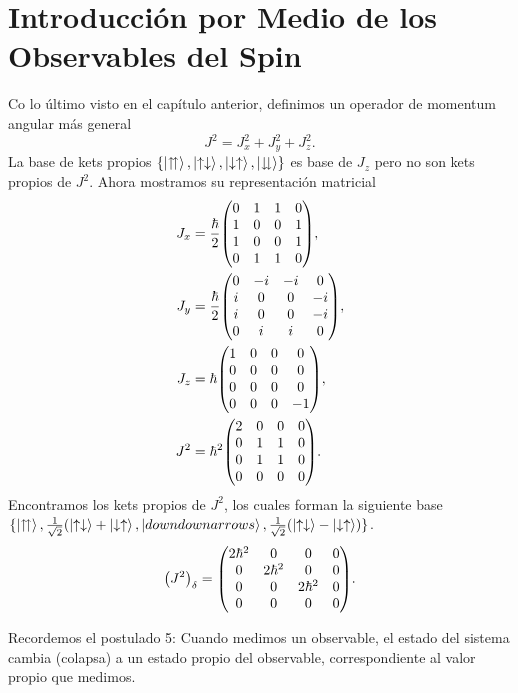 \section{Introducción por Medio de los Observables del Spin}
Co lo último visto en el capítulo anterior, definimos un operador de momentum angular más general
	\begin{equation}
		J^2 = J_x ^2 + J_y ^2 + J_z ^2 .
	\end{equation}
La base de kets propios $\{ \ket{\upuparrows}, \ket{\uparrow \downarrow}, \ket{\downarrow \uparrow}, \ket{\downdownarrows} \}$ es base de $J_z$ pero no son kets propios de $J^2$. Ahora mostramos su representación matricial
\begin{align}
	J_x &= \frac{\hbar}{2} \mqty(0 & 1 & 1 & 0 \\
								 1 & 0 & 0 & 1 \\
								 1 & 0 & 0 & 1 \\
								 0 & 1 & 1 & 0), \\
	J_y &= \frac{\hbar}{2} \mqty(0 & -i & -i & 0 \\
								 i & 0 & 0 & -i \\
								 i & 0 & 0 & -i \\
								 0 & i & i & 0), \\
	J_z &= \hbar \mqty(1 & 0 & 0 & 0 \\
								 0 & 0 & 0 & 0 \\
								 0 & 0 & 0 & 0 \\
								 0 & 0 & 0 & -1), \\
	J^2 &= \hbar ^2 \mqty(2 & 0 & 0 & 0 \\
								 0 & 1 & 1 & 0 \\
								 0 & 1 & 1 & 0 \\
								 0 & 0 & 0 & 0).
\end{align}
Encontramos los kets propios de $J^2$, los cuales forman la siguiente base $\{ \ket{\upuparrows}, \frac{1}{\sqrt{2}} (\ket{\uparrow \downarrow} + \ket{\downarrow \uparrow}, \ket{downdownarrows}, \frac{1}{\sqrt{2}} (\ket{\uparrow \downarrow} - \ket{\downarrow \uparrow}) \}$.
\begin{equation}
	\qty(J^2)_\delta = \mqty(2\hbar ^2 & 0 & 0 & 0 \\
							 0 & 2\hbar ^2 & 0 & 0 \\
							 0 & 0 & 2\hbar ^2 & 0 \\
							 0 & 0 & 0 & 0).
\end{equation}


Recordemos el postulado 5: Cuando medimos un observable, el estado del sistema cambia (colapsa) a un estado propio del observable, correspondiente al valor propio que medimos.

